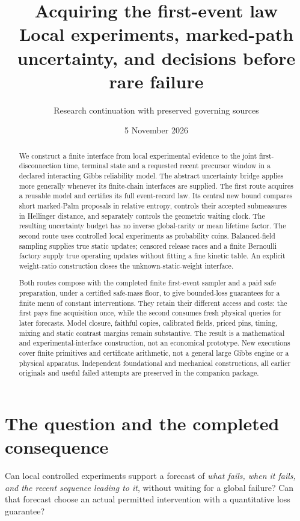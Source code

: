 \documentclass[10pt,a4paper]{article}
\title{\textbf{Acquiring the first-event law}\\[4pt]
\large Local experiments, marked-path uncertainty, and decisions before rare failure}
\author{Research continuation with preserved governing sources}
\date{5 November 2026}
\begin{document}
\maketitle
\begin{abstract}
We construct a finite interface from local experimental evidence to the
joint first-disconnection time, terminal state and a requested recent
precursor window in a declared interacting Gibbs reliability model.
The abstract uncertainty bridge applies more generally whenever its
finite-chain interfaces are supplied. The first route acquires a reusable
model and certifies its full
event-record law. Its central new bound compares short marked-Palm
proposals in relative entropy, controls their accepted submeasures in
Hellinger distance, and separately controls the geometric waiting clock.
The resulting uncertainty budget has no inverse global-rarity or mean
lifetime factor. The second route uses controlled local experiments as
probability coins. Balanced-field sampling supplies true static updates;
censored release races and a finite Bernoulli factory supply true operating
updates without fitting a fine kinetic table. An explicit weight-ratio
construction closes the unknown-static-weight interface.

Both routes compose with the completed finite first-event sampler and a
paid safe preparation, under a certified safe-mass floor, to give
bounded-loss guarantees for a finite menu
of constant interventions. They retain their different access and costs:
the first pays fine acquisition once, while the second consumes fresh
physical queries for later forecasts. Model closure, faithful copies,
calibrated fields, priced pins, timing, mixing and static contrast margins
remain substantive. The result is a mathematical and experimental-interface
construction, not an economical prototype. New executions cover finite
primitives and certificate arithmetic, not a general large Gibbs engine
or a physical apparatus. Independent foundational and mechanical
constructions, all earlier originals and useful failed attempts are
preserved in the companion package.
\end{abstract}

\section{The question and the completed consequence}
Can local controlled experiments support a forecast of \emph{what fails,
when it fails, and the recent sequence leading to it}, without waiting
for a global failure? Can that forecast choose an actual permitted
intervention with a quantitative loss guarantee?
\end{document}

